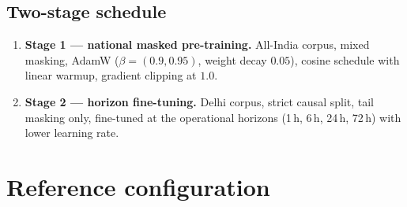 \documentclass[11pt,a4paper]{article}
\begin{document}
\subsection{Two-stage schedule}

\begin{enumerate}[leftmargin=1.4em]
\item \textbf{Stage 1 --- national masked pre-training.} All-India corpus, mixed
masking, AdamW ($\beta=(0.9,0.95)$, weight decay $0.05$), cosine schedule with
linear warmup, gradient clipping at $1.0$.
\item \textbf{Stage 2 --- horizon fine-tuning.} Delhi corpus, strict causal split,
tail masking only, fine-tuned at the operational horizons (1\,h, 6\,h, 24\,h,
72\,h) with lower learning rate.
\end{enumerate}

\section{Reference configuration}
\end{document}
